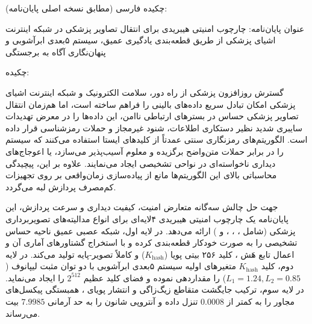 \clearpage{}
چکیده فارسی (مطابق نسخه اصلی پایان‌نامه):\par



عنوان پایان‌نامه: چارچوب امنیتی هیبریدی برای انتقال تصاویر پزشکی در شبکه اینترنت اشیای پزشکی  از طریق قطعه‌بندی یادگیری عمیق، سیستم ۵بعدی ابرآشوبی و پنهان‌نگاری آگاه به برجستگی\par



چکیده:\par

گسترش روزافزون پزشکی از راه دور، سلامت الکترونیک  و شبکه اینترنت اشیای پزشکی  امکان تبادل سریع داده‌های بالینی را فراهم ساخته است، اما هم‌زمان انتقال تصاویر پزشکی حساس در بسترهای ارتباطی ناامن، این داده‌ها را در معرض تهدیدات سایبری شدید نظیر دستکاری اطلاعات، شنود غیرمجاز و حملات رمزشناسی قرار داده است. الگوریتم‌های رمزنگاری سنتی عمدتاً از کلیدهای ایستا استفاده می‌کنند که سیستم را در برابر حملات متن‌واضح برگزیده  و معلوم  آسیب‌پذیر می‌سازد، یا اعوجاج‌های دیداری ناخواسته‌ای در نواحی تشخیصی ایجاد می‌نمایند. علاوه بر این، پیچیدگی محاسباتی بالای این الگوریتم‌ها مانع از پیاده‌سازی زمان‌واقعی بر روی تجهیزات کم‌مصرف پردازش لبه می‌گردد.\par



جهت حل چالش سه‌گانه متعارض امنیت، کیفیت دیداری و سرعت پردازش، این پایان‌نامه یک چارچوب امنیتی هیبریدی ۴لایه‌ای برای انواع مدالیته‌های تصویربرداری پزشکی (شامل ، ، ، و ) ارائه می‌دهد. در لایه اول، شبکه عصبی عمیق  ناحیه حساس تشخیصی  را به صورت خودکار قطعه‌بندی کرده و با استخراج گشتاورهای آماری آن و اعمال تابع هَش ، کلید ۲۵۶ بیتی پویا ($K_{\mathrm{hash}}$) و کاملاً تصویر{-}پایه تولید می‌کند. در لایه دوم، کلید $K_{\mathrm{hash}}$ متغیرهای اولیه سیستم ۵بعدی ابرآشوبی با دو توان مثبت لیپانوف ($L_1 = 1.24,\allowbreak{} L_2 = 0.85$) را مقداردهی نموده و فضای کلید عظیم $2^{512}$ را ایجاد می‌نماید. در لایه سوم، ترکیب جایگشت متقاطع زیگ‌زاگی و انتشار پویای ، همبستگی پیکسل‌های مجاور را به کمتر از $0.0008$ تنزل داده و آنتروپی شانون را به حد آرمانی $7.9985$ بیت می‌رساند.\par

